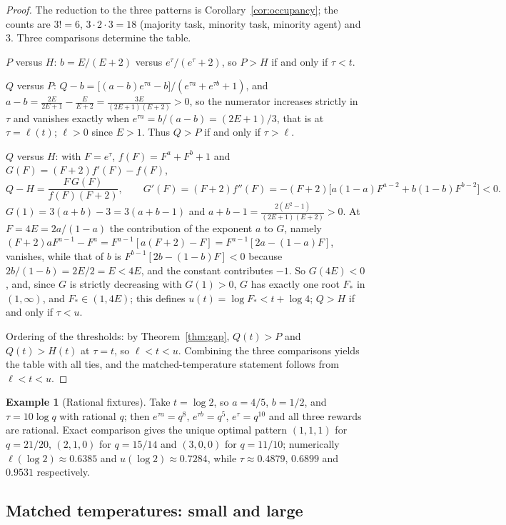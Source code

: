 \documentclass[11pt]{article}
\theoremstyle{plain}
\theoremstyle{definition}
\newtheorem{example}[theorem]{Example}
\theoremstyle{remark}
\begin{document}
\begin{proof}
The reduction to the three patterns is Corollary~\ref{cor:occupancy}; the counts are $3!=6$, $3\cdot2\cdot3=18$ (majority task, minority task, minority agent) and $3$. Three comparisons determine the table.

$P$ versus $H$: $b=E/(E+2)$ versus $e^\tau/(e^\tau+2)$, so $P>H$ if and only if $\tau<t$.

$Q$ versus $P$: $Q-b=\bigl[(a-b)e^{\tau a}-b\bigr]/(e^{\tau a}+e^{\tau b}+1)$, and $a-b=\frac{2E}{2E+1}-\frac{E}{E+2}=\frac{3E}{(2E+1)(E+2)}>0$, so the numerator increases strictly in $\tau$ and vanishes exactly when $e^{\tau a}=b/(a-b)=(2E+1)/3$, that is at $\tau=\ell(t)$; $\ell>0$ since $E>1$. Thus $Q>P$ if and only if $\tau>\ell$.

$Q$ versus $H$: with $F=e^\tau$, $f(F)=F^a+F^b+1$ and $G(F)=(F+2)f'(F)-f(F)$,
\[
 Q-H=\frac{F\,G(F)}{f(F)(F+2)},\qquad G'(F)=(F+2)f''(F)=-(F+2)\bigl[a(1-a)F^{a-2}+b(1-b)F^{b-2}\bigr]<0 .
\]
$G(1)=3(a+b)-3=3(a+b-1)$ and $a+b-1=\frac{2(E^2-1)}{(2E+1)(E+2)}>0$. At $F=4E=2a/(1-a)$ the contribution of the exponent $a$ to $G$, namely $(F+2)aF^{a-1}-F^a=F^{a-1}[a(F+2)-F]=F^{a-1}[2a-(1-a)F]$, vanishes, while that of $b$ is $F^{b-1}[2b-(1-b)F]<0$ because $2b/(1-b)=2E/2=E<4E$, and the constant contributes $-1$. So $G(4E)<0$, and, since $G$ is strictly decreasing with $G(1)>0$, $G$ has exactly one root $F_*$ in $(1,\infty)$, and $F_*\in(1,4E)$; this defines $u(t)=\log F_*<t+\log4$; $Q>H$ if and only if $\tau<u$.

Ordering of the thresholds: by Theorem~\ref{thm:gap}, $Q(t)>P$ and $Q(t)>H(t)$ at $\tau=t$, so $\ell<t<u$. Combining the three comparisons yields the table with all ties, and the matched-temperature statement follows from $\ell<t<u$.
\end{proof}

\begin{example}[Rational fixtures]\label{ex:fixtures}
Take $t=\log2$, so $a=4/5$, $b=1/2$, and $\tau=10\log q$ with rational $q$; then $e^{\tau a}=q^8$, $e^{\tau b}=q^5$, $e^\tau=q^{10}$ and all three rewards are rational. Exact comparison gives the unique optimal pattern $(1,1,1)$ for $q=21/20$, $(2,1,0)$ for $q=15/14$ and $(3,0,0)$ for $q=11/10$; numerically $\ell(\log2)\approx0.6385$ and $u(\log2)\approx0.7284$, while $\tau\approx0.4879$, $0.6899$ and $0.9531$ respectively.
\end{example}

\subsection{Matched temperatures: small and large}\label{sec:asymptotics}
\end{document}
